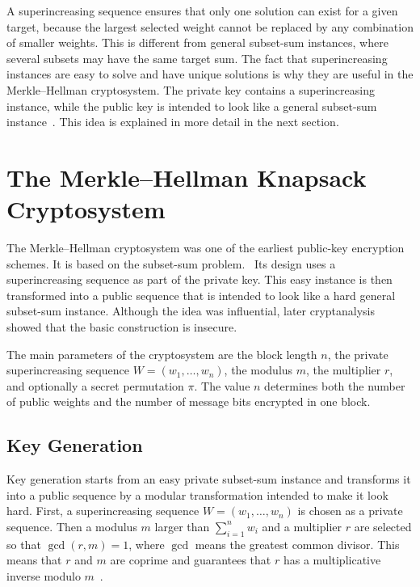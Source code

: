 A superincreasing sequence ensures that only one solution can exist for a given
target, because the largest selected weight cannot be replaced by any
combination of smaller weights. This is different from general subset-sum
instances, where several subsets may have the same target sum. The fact that
superincreasing instances are easy to solve and have unique solutions is why
they are useful in the Merkle--Hellman cryptosystem. The private key contains a
superincreasing instance, while the public key is intended to look like a
general subset-sum instance~\cite[pp.~525--526]{MerkleHellman1978}\cite[pp.~77--79]{OdlyzkoRiseFall}.
This idea is explained in more detail in the next section.

\section{The Merkle--Hellman Knapsack Cryptosystem}
\label{sec:merkle-hellman}

The Merkle--Hellman cryptosystem was one of the earliest public-key encryption
schemes. It is based on the subset-sum problem.~\cite{MerkleHellman1978} Its
design uses a superincreasing sequence as part of the private key. This easy
instance is then transformed into a public sequence that is intended to look
like a hard general subset-sum instance. Although the idea was influential,
later cryptanalysis showed that the basic construction is
insecure.~\cite{Shamir1982}

The main parameters of the cryptosystem are the block length $n$, the private superincreasing
sequence $W=(w_1,\dots,w_n)$, the modulus $m$, the multiplier $r$, and
optionally a secret permutation $\pi$. The value $n$ determines both the number
of public weights and the number of message bits encrypted in one block.

\subsection{Key Generation}

Key generation starts from an easy private subset-sum instance and transforms
it into a public sequence by a modular transformation intended to make it look
hard. First, a superincreasing sequence $W=(w_1,\dots,w_n)$ is chosen as a
private sequence. Then a modulus $m$ larger than $\sum_{i=1}^n w_i$ and a
multiplier $r$ are selected so that $\gcd(r,m)=1$, where $\gcd$ means the
greatest common divisor. This means that $r$ and $m$ are coprime and guarantees
that $r$ has a multiplicative inverse modulo $m$~\cite[pp.~212--213]{stanoyevitch2011}.

